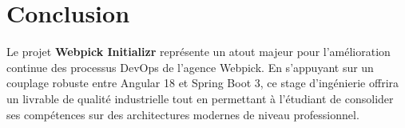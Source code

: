 \documentclass[12pt,a4paper]{article}
\begin{document}
\newpage
\section{Conclusion}
Le projet \textbf{Webpick Initializr} représente un atout majeur pour l'amélioration continue des processus DevOps de l'agence Webpick. En s'appuyant sur un couplage robuste entre Angular 18 et Spring Boot 3, ce stage d'ingénierie offrira un livrable de qualité industrielle tout en permettant à l'étudiant de consolider ses compétences sur des architectures modernes de niveau professionnel.
\end{document}
